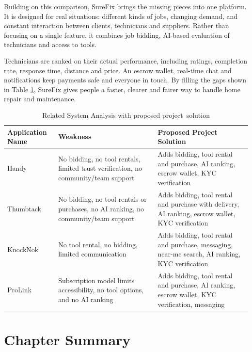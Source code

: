 \documentclass[A4paper,12pt]{report}
\theoremstyle{plain}
\theoremstyle{definition}
\theoremstyle{remark}
\numberwithin{equation}{section}
\begin{document}
Building on this comparison, SureFix brings the missing pieces into one platform. It is designed for real situations: different kinds of jobs, changing demand, and constant interaction between clients, technicians and suppliers. Rather than focusing on a single feature, it combines job bidding, AI-based evaluation of technicians and access to tools.

Technicians are ranked on their actual performance, including ratings, completion rate, response time, distance and price. An escrow wallet, real-time chat and notifications keep payments safe and everyone in touch. By filling the gaps shown in Table \ref{tab:sample}, SureFix gives people a faster, clearer and fairer way to handle home repair and maintenance.

\begin{table}[h!] 
    \centering 
    \caption{Related System Analysis with proposed project solution} 
    \label{tab:sample} 
    \begin{tabular}{|p{}|p{}|p{}|} \hline \textbf{Application Name} & \textbf{Weakness} & \textbf{Proposed Project Solution} 
    \\ \hline
        Handy & No bidding, no tool rentals, limited trust verification, no community/team support & Adds bidding, tool rental and purchase, AI ranking, escrow wallet, KYC verification\\
    \hline Thumbtack & No bidding, no tool rentals or purchases, no AI ranking, no community/team support & Adds bidding, tool rental and purchase with delivery, AI ranking, escrow wallet, KYC verification \\
    \hline KnockNok & No tool rental, no bidding, limited communication & Adds bidding, tool rental and purchase, messaging, near-me search, AI ranking, KYC verification \\
    \hline ProLink & Subscription model limits accessibility, no tool options, and no AI ranking & Adds bidding, tool rental and purchase, AI ranking, escrow wallet, KYC verification, messaging \\  
    
    \hline 
    \end{tabular} 
\end{table}




\section{Chapter Summary}
\end{document}
